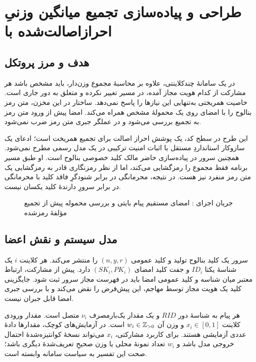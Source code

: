 \chapter{طراحی و پیاده‌سازی تجمیع میانگین وزنیِ احرازاصالت‌شده با }
\label{chap:sbhe}
\section{هدف و مرز پروتکل}
در یک سامانۀ چندکلاینتی، علاوه بر محاسبۀ مجموع وزن‌دار، باید مشخص باشد هر مشارکت از کدام هویت مجاز آمده، در مسیر تغییر نکرده و متعلق به دور جاری است. خاصیت همریختی به‌تنهایی این نیازها را پاسخ نمی‌دهد. ساختار  در این مخزن، متن رمز بنالوح را با امضای  روی یک محمولۀ مشخص همراه می‌کند. امضا پیش از ورود متن رمز به تجمیع بررسی می‌شود و در عملگر جبری متن رمز ضرب نمی‌شود.

این طرح در سطح کد، یک پوشش احراز اصالت برای تجمیع همریخت است؛ ادعای یک سازوکار استانداردِ مستقل  با اثبات امنیت ترکیبی در یک مدل رسمی مطرح نمی‌شود. همچنین سرور در پیاده‌سازی حاضر مالک کلید خصوصی بنالوح است. او طبق مسیر برنامه فقط مجموع را رمزگشایی می‌کند، اما از نظر رمزنگاری قادر به رمزگشایی یک متن رمز منفرد نیز هست. در نتیجه، محرمانگی در برابر شنودگرِ فاقد کلید با محرمانگی در برابر سرورِ دارندۀ کلید یکسان نیست.

\begin{figure}[htbp]
\centering
\caption{جریان اجرای : امضای مستقیم پیام بایتی و بررسی محموله پیش از تجمیع مؤلفۀ رمز‌شده}
\label{fig:sbhe-workflow}
\end{figure}

\section{مدل سیستم و نقش اعضا}
سرور یک کلید بنالوح تولید و کلید عمومی $(n,y,r)$ را منتشر می‌کند. هر کلاینت $i$ یک شناسۀ یکتا $ID_i$ و جفت کلید امضای $(SK_i,PK_i)$ دارد. پیش از مشارکت، ارتباط معتبر میان شناسه و کلید عمومی امضا باید در فهرست مجاز سرور ثبت شود. جایگزینی کلید یک هویت مجاز توسط مهاجم، این پیش‌فرض را نقض می‌کند و با بررسی جبری امضا قابل جبران نیست.

هر پیام به شناسۀ دور $RID$ و یک مقدار یک‌بارمصرف $\nu_i$ متصل است. مقدار ورودی کلاینت $x_i\in[0,1]$ و وزن آن $w_i\in\mathbb{Z}_{>0}$ است. در آزمایش‌های کوچک، مقدارها دادۀ عددی آزمایشی هستند. برای کاربرد مشارکتی، $x_i$ می‌تواند نسخۀ کوانتیزه‌شدۀ احتمال خروجی مدل باشد و $w_i$ تعداد نمونۀ محلی یا وزن صحیحِ تعریف‌شدۀ دیگری باشد؛ صحت این تفسیر به سیاست سامانه وابسته است.

